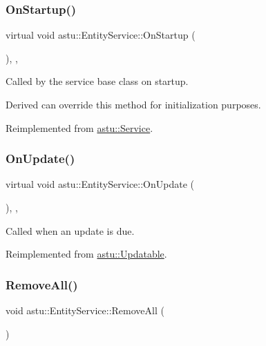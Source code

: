 \subsubsection{\texorpdfstring{On\+Startup()}{OnStartup()}}
{\footnotesize\ttfamily virtual void astu\+::\+Entity\+Service\+::\+On\+Startup (\begin{DoxyParamCaption}{ }\end{DoxyParamCaption})\hspace{0.3cm}{\ttfamily [override]}, {\ttfamily [protected]}, {\ttfamily [virtual]}}

Called by the service base class on startup.

Derived can override this method for initialization purposes. 

Reimplemented from \hyperlink{classastu_1_1Service_a357dc663e000b1f086f681ec3c459bfe}{astu\+::\+Service}.

\mbox{\label{classastu_1_1EntityService_a70831a8dc185652c2c9056c4e3cc10e0}} 
\subsubsection{\texorpdfstring{On\+Update()}{OnUpdate()}}
{\footnotesize\ttfamily virtual void astu\+::\+Entity\+Service\+::\+On\+Update (\begin{DoxyParamCaption}{ }\end{DoxyParamCaption})\hspace{0.3cm}{\ttfamily [override]}, {\ttfamily [protected]}, {\ttfamily [virtual]}}

Called when an update is due. 

Reimplemented from \hyperlink{classastu_1_1Updatable_a925566c9770b95895c6c7294f9d51528}{astu\+::\+Updatable}.

\mbox{\label{classastu_1_1EntityService_a1b21cf207324748c13c34568d3c1513e}} 
\subsubsection{\texorpdfstring{Remove\+All()}{RemoveAll()}}
{\footnotesize\ttfamily void astu\+::\+Entity\+Service\+::\+Remove\+All (\begin{DoxyParamCaption}{ }\end{DoxyParamCaption})}

